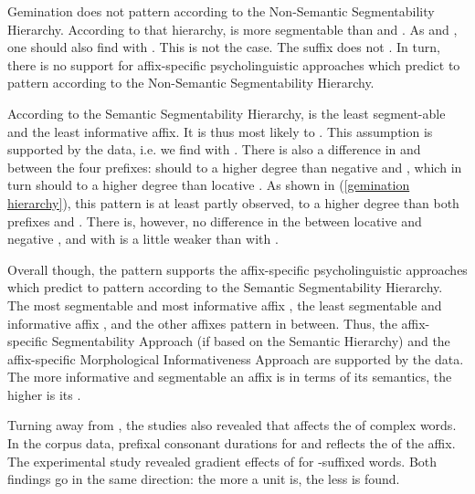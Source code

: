 Gemination does not pattern according to the Non-Semantic Segmentability Hierarchy. According to that hierarchy,  is more segmentable than  and . As  and  , one should also find  with . This is not the case. The suffix  does not .  In turn, there is no support for affix-specific psycholinguistic approaches which predict  to pattern according to the Non-Semantic Segmentability Hierarchy.


According to the Semantic Segmentability Hierarchy,  is the least segment-able and the least informative affix. It is thus most likely to . This assumption is supported by the data, i.e. we find  with . There is also a difference in  and  between the four prefixes:  should  to a higher degree than negative  and , which in turn should  to a higher degree than locative . As shown in (\ref{gemination hierarchy}), this pattern is at least partly observed,   to a higher degree than both prefixes and . There is, however, no difference in the  between locative  and negative , and  with  is a little weaker than  with . 


Overall though, the  pattern supports the affix-specific psycholinguistic approaches which predict  to pattern according to the Semantic Segmentability Hierarchy. The most segmentable and most informative affix  , the least segmentable and informative affix  , and the other affixes pattern in between.
Thus, the affix-specific Segmentability Approach (if based on the Semantic Hierarchy) and the affix-specific Morphological Informativeness Approach are supported by the data. The more informative and segmentable an affix is in terms of its semantics, the higher is its .


Turning away from , the studies also revealed that  affects the  of complex words.
 In the corpus data, prefixal consonant durations for  and  reflects the  of the affix. 
The experimental study revealed gradient effects of  for -suffixed words. 
Both findings go in the same direction: the more  a unit is, the less  is found. 

